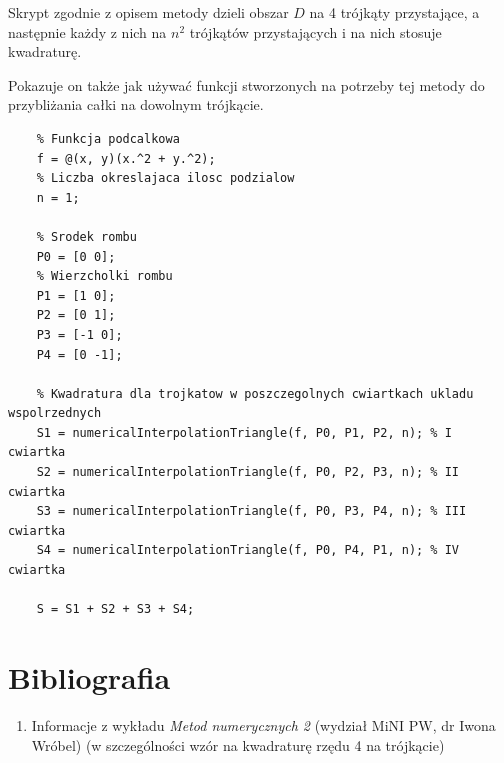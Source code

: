 \documentclass[12pt]{article}
\begin{document}
	Skrypt zgodnie z opisem metody dzieli obszar $D$ na 4 trójkąty przystające, a następnie każdy z nich na $n^2$ trójkątów przystających i na nich stosuje kwadraturę.
	
	Pokazuje on także jak używać funkcji stworzonych na potrzeby tej metody do przybliżania całki na dowolnym trójkącie.
	
	\begin{lstlisting}[frame=single]
	% Parametry:
	% Funkcja podcalkowa
	f = @(x, y)(x.^2 + y.^2);
	% Liczba okreslajaca ilosc podzialow
	n = 1;
	
	% Srodek rombu
	P0 = [0 0];
	% Wierzcholki rombu
	P1 = [1 0];
	P2 = [0 1];
	P3 = [-1 0];
	P4 = [0 -1];
	
	% Kwadratura dla trojkatow w poszczegolnych cwiartkach ukladu wspolrzednych
	S1 = numericalInterpolationTriangle(f, P0, P1, P2, n); % I cwiartka
	S2 = numericalInterpolationTriangle(f, P0, P2, P3, n); % II cwiartka
	S3 = numericalInterpolationTriangle(f, P0, P3, P4, n); % III cwiartka
	S4 = numericalInterpolationTriangle(f, P0, P4, P1, n); % IV cwiartka
	
	S = S1 + S2 + S3 + S4;
	\end{lstlisting}
	
	
	
	\section{Bibliografia}
	\begin{enumerate}
		\item Informacje z wykładu \textit{Metod numerycznych 2} (wydział MiNI PW, dr Iwona Wróbel) (w szczególności wzór na kwadraturę rzędu 4 na trójkącie)
	\end{enumerate}
	
\end{document}
